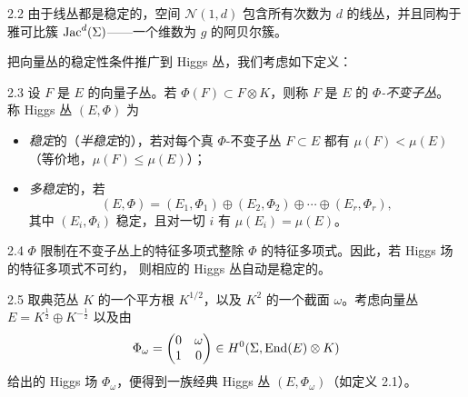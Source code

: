 \begin{exmp}{2.2}
由于线丛都是稳定的，空间 $\mathcal{N}(1,d)$ 包含所有次数为 $d$ 的线丛，并且同构于雅可比簇
$\operatorname{Jac}^d(\Sigma)$——一个维数为 $g$ 的阿贝尔簇。
\end{exmp}

把向量丛的稳定性条件推广到 Higgs 丛，我们考虑如下定义：

\begin{defn}{2.3}
设 $F$ 是 $E$ 的向量子丛。若 $\Phi(F)\subset F\otimes K$，则称 $F$ 是 $E$ 的 \emph{$\Phi$-不变子丛}。
称 Higgs 丛 $(E,\Phi)$ 为
\begin{itemize}[leftmargin=1.6em,itemsep=2pt,topsep=2pt]
\item \emph{稳定}的（\emph{半稳定}的），若对每个真 $\Phi$-不变子丛 $F\subset E$ 都有
  $\mu(F)<\mu(E)$（等价地，$\mu(F)\le\mu(E)$）；
\item \emph{多稳定}的，若
  \[
    (E,\Phi) = (E_1,\Phi_1)\oplus(E_2,\Phi_2)\oplus\cdots\oplus(E_r,\Phi_r),
  \]
  其中 $(E_i,\Phi_i)$ 稳定，且对一切 $i$ 有 $\mu(E_i)=\mu(E)$。
\end{itemize}
\end{defn}

\begin{rem}{2.4}
$\Phi$ 限制在不变子丛上的特征多项式整除 $\Phi$ 的特征多项式。因此，若 Higgs 场的特征多项式不可约，
则相应的 Higgs 丛自动是稳定的。
\end{rem}

\begin{exmp}{2.5}
取典范丛 $K$ 的一个平方根 $K^{1/2}$，以及 $K^2$ 的一个截面 $\omega$。考虑向量丛
$E=K^{\frac12}\oplus K^{-\frac12}$ 以及由
\[
  \Phi_\omega = \begin{pmatrix} 0 & \omega \\ 1 & 0 \end{pmatrix}
  \in H^0(\Sigma,\operatorname{End}(E)\otimes K)
\]
给出的 Higgs 场 $\Phi_\omega$，便得到一族经典 Higgs 丛 $(E,\Phi_\omega)$（如定义 2.1）。
\end{exmp}

